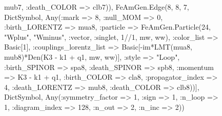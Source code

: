 \documentclass{revtex4}
\begin{document}
\begin{figure}[!htb]
\begin{center}
{mub7, :death_COLOR => clb7)), FeAmGen.Edge(8, 8, 7, Dict{Symbol, Any}(:mark => 8, :null_MOM => 0, :birth_LORENTZ => mua8, :particle => FeAmGen.Particle(24, "Wplus", "Wminus", :vector, :singlet, 1//1, mw, ww), :color_list => Basic[1], :couplings_lorentz_list => Basic[-im*LMT(mua8, mub8)*Den(K3 - k1 + q1, mw, ww)], :style => "Loop", :birth_SPINOR => spa8, :death_SPINOR => spb8, :momentum => K3 - k1 + q1, :birth_COLOR => cla8, :propagator_index => 4, :death_LORENTZ => mub8, :death_COLOR => clb8))], Dict{Symbol, Any}(:symmetry_factor => 1, :sign => 1, :n_loop => 1, :diagram_index => 128, :n_out => 2, :n_inc => 2)) 
}
\end{center}
\end{figure}
\end{document}
